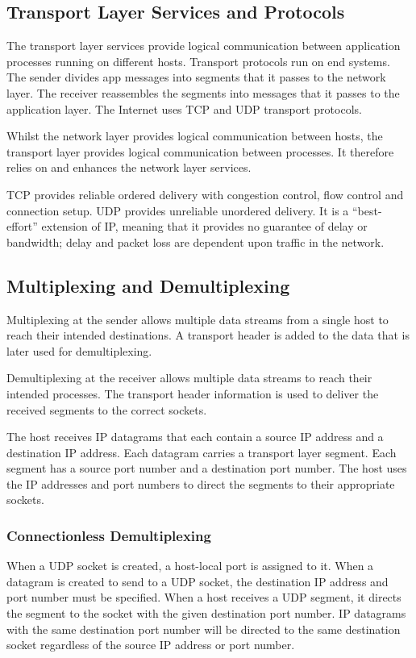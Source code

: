 \subsection{Transport Layer Services and Protocols}

The transport layer services provide logical communication between application processes running on different hosts.
Transport protocols run on end systems.
The sender divides app messages into segments that it passes to the network layer.
The receiver reassembles the segments into messages that it passes to the application layer.
The Internet uses TCP and UDP transport protocols.

Whilst the network layer provides logical communication between hosts, the transport layer provides logical communication between processes.
It therefore relies on and enhances the network layer services.

TCP provides reliable ordered delivery with congestion control, flow control and connection setup.
UDP provides unreliable unordered delivery.
It is a ``best-effort'' extension of IP, meaning that it provides no guarantee of delay or bandwidth; delay and packet loss are dependent upon traffic in the network.

\subsection{Multiplexing and Demultiplexing}

Multiplexing at the sender allows multiple data streams from a single host to reach their intended destinations.
A transport header is added to the data that is later used for demultiplexing.

Demultiplexing at the receiver allows multiple data streams to reach their intended processes.
The transport header information is used to deliver the received segments to the correct sockets.

The host receives IP datagrams that each contain a source IP address and a destination IP address.
Each datagram carries a transport layer segment.
Each segment has a source port number and a destination port number.
The host uses the IP addresses and port numbers to direct the segments to their appropriate sockets.

\subsubsection{Connectionless Demultiplexing}

When a UDP socket is created, a host-local port is assigned to it.
When a datagram is created to send to a UDP socket, the destination IP address and port number must be specified.
When a host receives a UDP segment, it directs the segment to the socket with the given destination port number.
IP datagrams with the same destination port number will be directed to the same destination socket regardless of the source IP address or port number.


